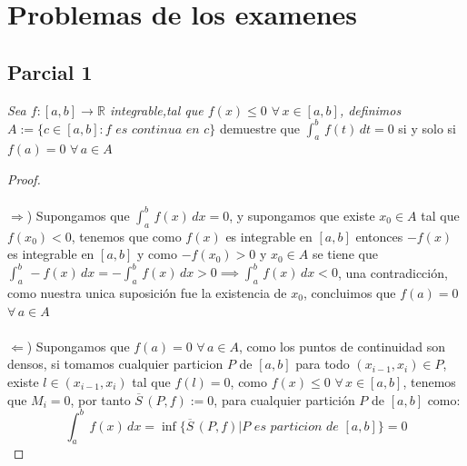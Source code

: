 \documentclass[11pt,letterpaper]{article}
\newcommand{\R}{\mathbb{R}}
\begin{document}
\section*{Problemas de los examenes}
\subsection*{Parcial 1}
\begin{tcolorbox}[
	title = \textcolor{black}{\textcolor{white}{Parcial 1}},]
\textit{Sea $f:[a,b]\rightarrow \R$ integrable,tal que $f(x)\leq 0$ $\forall\,x\in[a,b]$, definimos \\$A:=\{c\in [a,b]:f\,\,es \,\,continua\,\,en\,\,c\}$} demuestre que $\int_{a}^{b}\,f(t)\,dt=0$ si y solo si $f(a)=0$ $\forall\,a\in A$
\end{tcolorbox}
\begin{proof}\,\\
    \,\\
    $\Rightarrow$)\,\,Supongamos que $\int_{a}^{b}\,f(x)\,dx=0$, y supongamos que existe $x_0\in A$ tal que $f(x_0)<0$, tenemos que como $f(x)$ es integrable en $[a,b]$ entonces $-f(x)$ es integrable en $[a,b]$ y como $-f(x_0)>0$ y $x_0\in A$ se tiene que $\int_{a}^{b}\,-f(x)\,dx=-\int_{a}^{b}\,f(x)\,dx>0\implies\int_{a}^{b}\,f(x)\,dx<0$, una contradicci\'on, como nuestra unica suposici\'on
    fue la existencia de $x_0$, concluimos que $f(a)=0$ $\forall\,a\in A$\,\\
    \,\\
    $\Leftarrow$)\,\,Supongamos que $f(a)=0$ $\forall\,a\in A$, como los puntos de continuidad son densos, si tomamos cualquier particion $P$ de $[a,b]$
    para todo $(x_{i-1},x_i)\in P$, existe $l\in (x_{i-1},x_i)$ tal que $f(l)=0$, como $f(x)\leq 0$ $\forall\,x\in[a,b]$, tenemos que $M_i=0$, por tanto $\overline{S}\,(P,f):=0$, para cualquier partici\'on $P$ de $[a,b]$
    como:\,\\
    \begin{equation*}
        \int_{a}^{b}\,f(x)\,dx=\inf\{\overline{S}\,(P,f)|P\,\,es\,\,particion\,\,de\,\,[a,b]\}=0
    \end{equation*}
    
\end{proof}
\end{document}

